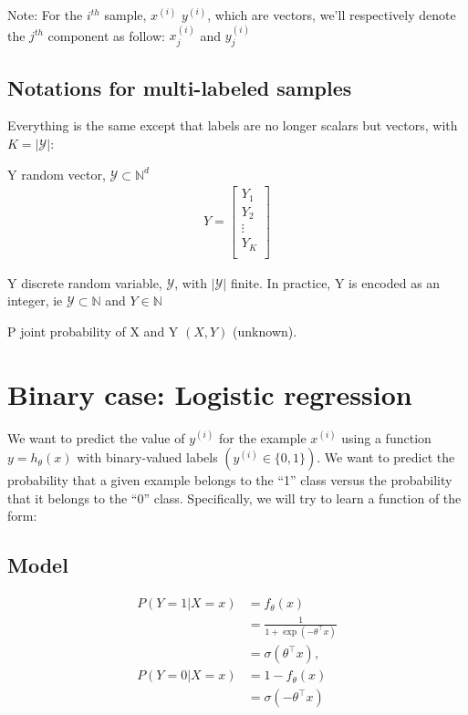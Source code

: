Note:
For the $i^{th}$ sample, $x^{(i)}$ $y^{(i)}$, which are vectors, we'll respectively denote the $j^{th}$ component as follow: $x_j^{(i)}$ and $y_j^{(i)}$


\subsection*{Notations for multi-labeled samples}

Everything is the same except that labels are no longer scalars but vectors, with $K = |\mathcal{Y}|$:

\begin{outline}
\1 Y random vector, $\mathcal{Y} \subset \mathbb{N}^d$
\begin{align}
	Y = \left[
	\begin{array}{cccc}
		Y_{1} \\
		Y_{2} \\
		\vdots\\
		Y_{K} \\
	\end{array}\right]
\end{align}

\1 Y discrete random variable, $\mathcal{Y} $, with $|\mathcal{Y}|$ finite. In practice, Y is encoded as an integer, ie $\mathcal{Y} \subset \mathbb{N} $ and $Y \in \mathbb{N}$

\1 P joint probability of X and Y $(X,Y)$ (unknown).
\end{outline}






\section{Binary case: Logistic regression} %
\label{sec:workflow}


We want to predict the value of $y^{(i)}$ for the example $x^{(i)}$ using a function $y = h_\theta(x) $ with binary-valued labels $\left(y^{(i)} \in \{0,1\}\right)$. We want to predict the probability that a given example belongs to the “1” class versus the probability that it belongs to the “0” class. Specifically, we will try to learn a function of the form:

\subsection{Model}
\begin{align}
	P(Y=1|X=x) &= f_\theta(x) \\
			   &= \frac{1}{1 + \exp(-\theta^\top x)} \\
			   &= \sigma(\theta^\top x),\\
	P(Y=0|X=x) &= 1 - f_\theta(x) \\
			   &= \sigma(-\theta^\top x)
\end{align}

